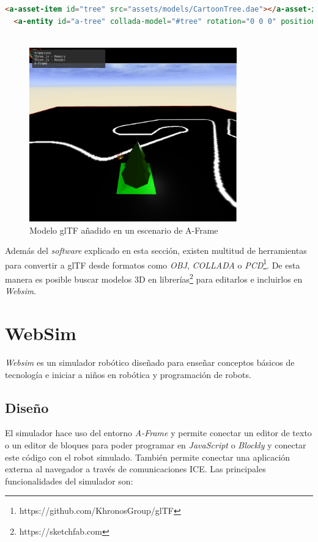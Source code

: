\begin{lstlisting}[language=html, caption=Código para añadir un modelo 3D personalizado a A-Frame]
 <a-asset-item id="tree" src="assets/models/CartoonTree.dae"></a-asset-item>
  <a-entity id="a-tree" collada-model="#tree" rotation="0 0 0" position="2.75 0.01 -2.27">
  
\end{lstlisting}

\begin{figure}[H]
\centering
\includegraphics[width=0.8\textwidth]{img/tree_aframe.png}
\caption{Modelo glTF añadido en un escenario de A-Frame} \label{fig:tree}
\end{figure}
Además del \textit{software} explicado en esta sección, existen multitud de herramientas para convertir a glTF desde formatos como \textit{OBJ}, \textit{COLLADA} o  \textit{PCD}\footnote{https://github.com/KhronosGroup/glTF}. De esta manera es posible buscar modelos 3D en librerías\footnote{https://sketchfab.com} para editarlos e incluirlos en \textit{Websim}.

\section{WebSim}

\textit{Websim} es un simulador robótico diseñado para enseñar conceptos básicos de tecnología e iniciar a niños en robótica y programación de robots. 

\subsection{Diseño}
\label{subsec:design}
El simulador hace uso del entorno \textit{A-Frame} y permite conectar un editor de texto o un editor de bloques para poder programar en \textit{JavaScript} o \textit{Blockly} y conectar este código con el robot simulado. También permite conectar una aplicación externa al navegador a través de comunicaciones ICE.
Las principales funcionalidades del simulador son: 


